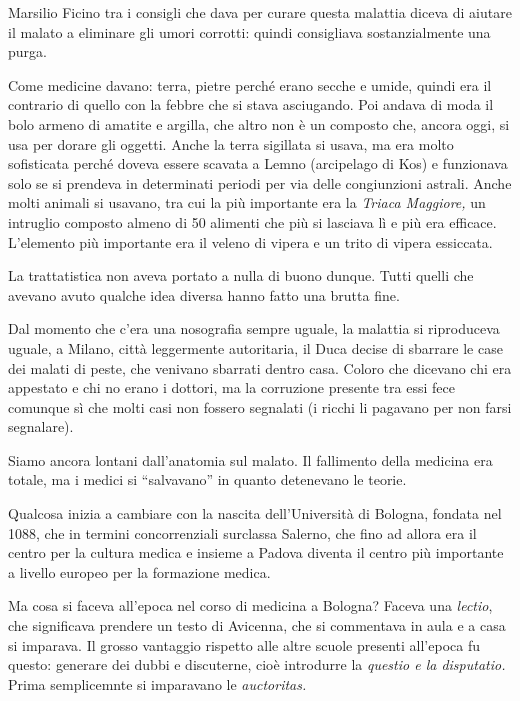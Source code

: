 Marsilio Ficino tra i consigli che dava per curare questa malattia
diceva di aiutare il malato a eliminare gli umori corrotti: quindi
consigliava sostanzialmente una purga.

Come medicine davano: terra, pietre perché erano secche e umide, quindi
era il contrario di quello con la febbre che si stava asciugando. Poi
andava di moda il bolo armeno di amatite e argilla, che altro non è un
composto che, ancora oggi, si usa per dorare gli oggetti. Anche la terra
sigillata si usava, ma era molto sofisticata perché doveva essere
scavata a Lemno (arcipelago di Kos) e funzionava solo se si prendeva in
determinati periodi per via delle congiunzioni astrali. Anche molti
animali si usavano, tra cui la più importante era la \emph{Triaca
Maggiore,} un intruglio composto almeno di 50 alimenti che più si
lasciava lì e più era efficace. L'elemento più importante era il veleno
di vipera e un trito di vipera essiccata.

La trattatistica non aveva portato a nulla di buono dunque. Tutti quelli
che avevano avuto qualche idea diversa hanno fatto una brutta fine.

Dal momento che c'era una nosografia sempre uguale, la malattia si
riproduceva uguale, a Milano, città leggermente autoritaria, il Duca
decise di sbarrare le case dei malati di peste, che venivano sbarrati
dentro casa. Coloro che dicevano chi era appestato e chi no erano i
dottori, ma la corruzione presente tra essi fece comunque sì che molti
casi non fossero segnalati (i ricchi li pagavano per non farsi
segnalare).

Siamo ancora lontani dall'anatomia sul malato. Il fallimento della
medicina era totale, ma i medici si ``salvavano'' in quanto detenevano
le teorie.

Qualcosa inizia a cambiare con la nascita dell'Università di Bologna,
fondata nel 1088, che in termini concorrenziali surclassa Salerno, che
fino ad allora era il centro per la cultura medica e insieme a Padova
diventa il centro più importante a livello europeo per la formazione
medica.

Ma cosa si faceva all'epoca nel corso di medicina a Bologna? Faceva una
\emph{lectio}, che significava prendere un testo di Avicenna, che si
commentava in aula e a casa si imparava. Il grosso vantaggio rispetto
alle altre scuole presenti all'epoca fu questo: generare dei dubbi e
discuterne, cioè introdurre la \emph{questio e la disputatio.} Prima
semplicemnte si imparavano le \emph{auctoritas. }

